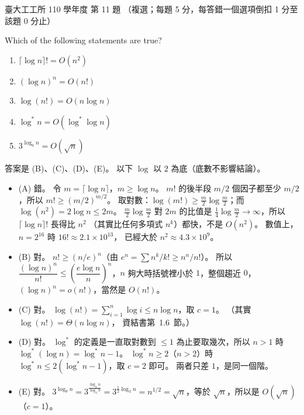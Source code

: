 \begin{pastexam}[label={px:ntu-110-ie-ds-11}]{臺大工工所 110 學年度 第 11 題}
（複選；每題 5 分，每答錯一個選項倒扣 1 分至該題 0 分止）

Which of the following statements are true?
\begin{enumerate}[label=(\Alph*)]
\item $\lceil\log n\rceil!=O(n^2)$
\item $(\log n)^n=O(n!)$
\item $\log(n!)=O(n\log n)$
\item $\log^* n=O(\log^*\log n)$
\item $3^{\log_9 n}=O(\sqrt{n})$
\end{enumerate}
\end{pastexam}

\begin{pastsoln}
答案是 (B)、(C)、(D)、(E)。 以下 $\log$ 以 $2$ 為底（底數不影響結論）。

\begin{itemize}
\item (A) 錯。 令 $m = \lceil \log n \rceil$，$m \ge \log n$。 $m!$ 的後半段 $m/2$ 個因子都至少 $m/2$，所以
$m! \ge (m/2)^{m/2}$。 取對數：$\log(m!) \ge \frac{m}{2}\log\frac{m}{2}$；而 $\log(n^2) = 2\log n \le 2m$。
$\frac{m}{2}\log\frac{m}{2}$ 對 $2m$ 的比值是 $\frac14 \log\frac m2 \to \infty$，所以 $\lceil\log n\rceil!$ 長得比 $n^2$
（其實比任何多項式 $n^k$）都快，不是 $O(n^2)$。 數值上，$n = 2^{16}$ 時 $16! \approx 2.1 \times 10^{13}$，
已經大於 $n^2 \approx 4.3 \times 10^9$。
\item (B) 對。 $n! \ge (n/e)^n$（由 $e^n = \sum n^k/k! \ge n^n/n!$）。 所以
$\dfrac{(\log n)^n}{n!} \le \left(\dfrac{e\log n}{n}\right)^n$，$n$ 夠大時括號裡小於 $1$，整個趨近 $0$，
$(\log n)^n = o(n!)$，當然是 $O(n!)$。
\item (C) 對。 $\log(n!) = \sum_{i=1}^{n}\log i \le n\log n$，取 $c = 1$。 （其實 $\log(n!) = \Theta(n\log n)$，
資結書第~1.6~節。）
\item (D) 對。 $\log^*$ 的定義是一直取對數到 $\le 1$ 為止要取幾次，所以 $n > 1$ 時
$\log^*(\log n) = \log^* n - 1$。 $\log^* n \ge 2$（$n > 2$）時 $\log^* n \le 2(\log^* n - 1)$，取 $c = 2$
即可。 兩者只差 $1$，是同一個階。
\item (E) 對。 $3^{\log_9 n} = 3^{\frac{\log_3 n}{\log_3 9}} = 3^{\frac12\log_3 n} = n^{1/2} = \sqrt n$，等於
$\sqrt n$，所以是 $O(\sqrt n)$（$c = 1$）。
\end{itemize}
\end{pastsoln}
